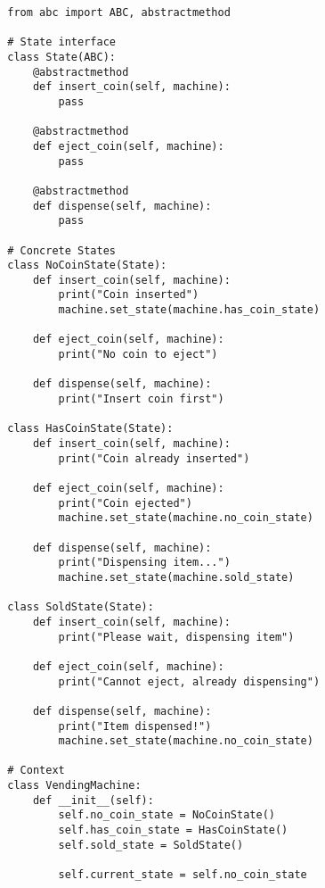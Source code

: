     \begin{example}
      \begin{lstlisting}
        from abc import ABC, abstractmethod

        # State interface
        class State(ABC):
            @abstractmethod
            def insert_coin(self, machine):
                pass
            
            @abstractmethod
            def eject_coin(self, machine):
                pass
            
            @abstractmethod
            def dispense(self, machine):
                pass

        # Concrete States
        class NoCoinState(State):
            def insert_coin(self, machine):
                print("Coin inserted")
                machine.set_state(machine.has_coin_state)
            
            def eject_coin(self, machine):
                print("No coin to eject")
            
            def dispense(self, machine):
                print("Insert coin first")

        class HasCoinState(State):
            def insert_coin(self, machine):
                print("Coin already inserted")
            
            def eject_coin(self, machine):
                print("Coin ejected")
                machine.set_state(machine.no_coin_state)
            
            def dispense(self, machine):
                print("Dispensing item...")
                machine.set_state(machine.sold_state)

        class SoldState(State):
            def insert_coin(self, machine):
                print("Please wait, dispensing item")
            
            def eject_coin(self, machine):
                print("Cannot eject, already dispensing")
            
            def dispense(self, machine):
                print("Item dispensed!")
                machine.set_state(machine.no_coin_state)

        # Context
        class VendingMachine:
            def __init__(self):
                self.no_coin_state = NoCoinState()
                self.has_coin_state = HasCoinState()
                self.sold_state = SoldState()
                
                self.current_state = self.no_coin_state
            

\end{lstlisting}
\end{example}
